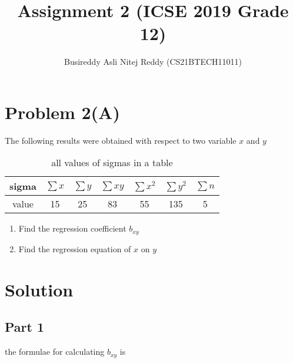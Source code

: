 \documentclass[journal,12pt,twocolumn]{IEEEtran}
\title{Assignment 2 (ICSE 2019 Grade 12) }
\author{Busireddy Asli Nitej Reddy (CS21BTECH11011)}
\date{}
\begin{document}
\maketitle



\section*{\textbf{Problem 2(A)}}
The following results were obtained with respect to two variable $x$ and $y$
    \begin{table}[!htb]
        \centering
        \resizebox{\columnwidth}{!} {
          
            \begin{tabular}{|c|c|c|c|c|c|c|}
              \hline
               sigma  &  $\sum x$  &  $\sum y$  &  $\sum xy$  &  $\sum x^{2}$  &  $\sum y^{2}$  & $\sum n$  \\  \hline
               value  &    15      &     25     &     83      &     55         &       135      &     5     \\  
              \hline
            \end{tabular}
            
            }
        \caption{all values of sigmas in a table}
        \label{tab:table}
    \end{table}

    \begin{enumerate}
       \item Find the regression coefficient $b_{xy}$
       \item Find the regression equation of $x$ on $y$
    \end{enumerate}



\section*{\textbf{Solution}}


  
\subsection*{\textbf{Part 1}}
   
   the formulae for calculating $b_{xy}$ is
   
\end{document}

